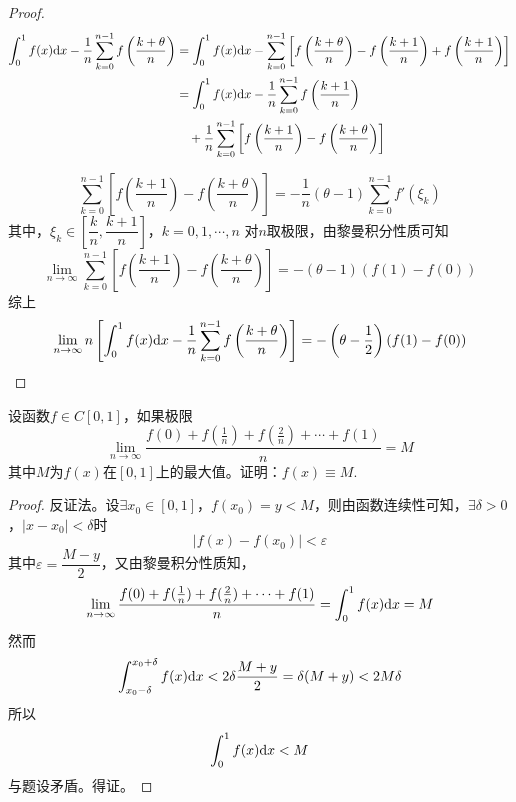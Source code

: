 \begin{proof}
    
    \begin{align*}
        \int_{0}^{1}{f(x)}\mathrm{d} x - \dfrac{1}{n}\sum\limits_{k = 0}^{n - 1}{f\left( \dfrac{k + \theta}{n} \right)} & = \int_{0}^{1}{f(x)}\mathrm{d} x - \sum\limits_{k = 0}^{n - 1}{\left[ f\left( \dfrac{k + \theta}{n} \right) - f\left( \dfrac{k + 1}{n} \right) + f\left( \dfrac{k + 1}{n} \right) \right]} \\
        & = \int_{0}^{1}{f(x)}\mathrm{d} x - \dfrac{1}{n}\sum\limits_{k = 0}^{n - 1}{f\left( \dfrac{k + 1}{n} \right)} \\
        & \quad + \dfrac{1}{n}\sum\limits_{k = 0}^{n - 1}{\left[ f\left( \dfrac{k + 1}{n} \right) - f\left( \dfrac{k + \theta}{n} \right) \right]}
    \end{align*}

    \[\sum\limits_{k = 0}^{n - 1}{\left[ f\left( \dfrac{k + 1}{n} \right) - f\left( \dfrac{k + \theta}{n} \right) \right]} = -\dfrac{1}{n}(\theta - 1)\sum\limits_{k = 0}^{n - 1}{f'(\xi_k)}\]
    其中，$\xi_k \in \left[ \dfrac{k}{n}, \dfrac{k + 1}{n} \right]$，$k = 0, 1, \cdots, n$
    对$n$取极限，由黎曼积分性质可知
    \[\lim\limits_{n \to \infty}{\sum\limits_{k = 0}^{n - 1}{\left[ f\left( \dfrac{k + 1}{n} \right) - f\left( \dfrac{k + \theta}{n} \right) \right]}} = -(\theta - 1)(f(1) - f(0))\]
    综上
    \[\lim\limits_{n \to \infty}{n \left[ \int_{0}^{1}{f(x)}\mathrm{d} x - \dfrac{1}{n}\sum\limits_{k = 0}^{n - 1}{f\left( \dfrac{k + \theta}{n} \right)} \right]} = -\left( \theta - \dfrac{1}{2} \right) (f(1) - f(0))\]

\end{proof}

\begin{proposition}

    设函数$f \in C[0, 1]$，如果极限
    \[\lim\limits_{n \to \infty}{\dfrac{f(0) + f(\frac{1}{n}) + f(\frac{2}{n}) + \cdots + f(1)}{n}} = M\]
    其中$M$为$f(x)$在$[0, 1]$上的最大值。证明：$f(x) \equiv M$.

\end{proposition}

\begin{proof}

    反证法。设$\exists x_0 \in [0, 1]$，$f(x_0) = y < M$，则由函数连续性可知，$\exists \delta > 0$，$|x - x_0| < \delta$时
    \[|f(x) - f(x_0)| < \varepsilon\]
    其中$\varepsilon = \dfrac{M - y}{2}$，又由黎曼积分性质知，
    \[\lim\limits_{n \to \infty}{\dfrac{f(0) + f(\frac{1}{n}) + f(\frac{2}{n}) + \cdots + f(1)}{n}} = \int_{0}^{1}{f(x)}\mathrm{d} x = M\]
    然而
    \[\int_{x_0 - \delta}^{x_0 + \delta}{f(x)}\mathrm{d} x < 2 \delta \dfrac{M + y}{2} = \delta (M + y) < 2M \delta\]
    所以
    \[\int_{0}^{1}{f(x)}\mathrm{d} x < M\]
    与题设矛盾。得证。

\end{proof}

